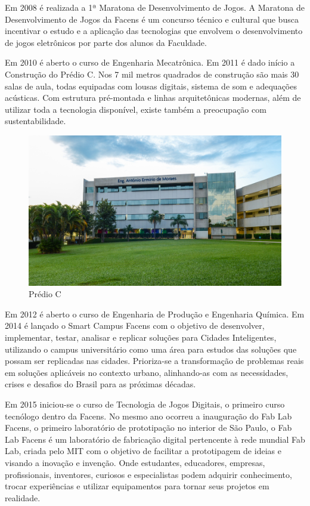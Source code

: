 \documentclass[
	12pt,				%
	oneside,			%
	a4paper,			%
	chapter=TITLE,		%
	section=TITLE,		%
	sumario=tradicional %
	english,			%
	french,				%
	spanish,			%
	brazil				%
	]{abntex2}
\begin{document}
Em 2008 é realizada a 1ª Maratona de Desenvolvimento de Jogos. A Maratona de Desenvolvimento de Jogos da Facens é um concurso técnico e cultural que busca incentivar o estudo e a aplicação das tecnologias que envolvem o desenvolvimento de jogos eletrônicos por parte dos alunos da Faculdade.

Em 2010 é aberto o curso de Engenharia Mecatrônica. Em 2011 é dado início a Construção do Prédio C. Nos 7 mil metros quadrados de construção são mais 30 salas de aula, todas equipadas com lousas digitais, sistema de som e adequações acústicas. Com estrutura pré-montada e linhas arquitetônicas modernas, além de utilizar toda a tecnologia disponível, existe também a preocupação com sustentabilidade.

\begin{figure}[htb]
	\caption{\label{fig:mapsfacens} Prédio C}
	\begin{center}
		\includegraphics[scale=0.85]{predioc}
	\end{center}
\end{figure}

Em 2012 é aberto o curso de Engenharia de Produção e Engenharia Química. Em 2014 é lançado o Smart Campus Facens com o objetivo de  desenvolver, implementar, testar, analisar e replicar soluções para Cidades Inteligentes, utilizando o campus universitário como uma área para estudos das soluções que possam ser replicadas nas cidades. Prioriza-se a transformação de problemas reais em soluções aplicáveis no contexto urbano, alinhando-as com as necessidades, crises e desafios do Brasil para as próximas décadas. 

Em 2015 iniciou-se o curso de Tecnologia de Jogos Digitais, o primeiro curso tecnólogo dentro da Facens. No mesmo ano ocorreu a inauguração do Fab Lab Facens, o primeiro laboratório de prototipação no interior de São Paulo, o Fab Lab Facens é um laboratório de fabricação digital pertencente à rede mundial Fab Lab, criada pelo MIT com o objetivo de facilitar a prototipagem de ideias e visando a inovação e invenção. Onde estudantes, educadores, empresas, profissionais, inventores, curiosos e especialistas podem adquirir conhecimento, trocar experiências e utilizar equipamentos para tornar seus projetos em realidade.
\end{document}
